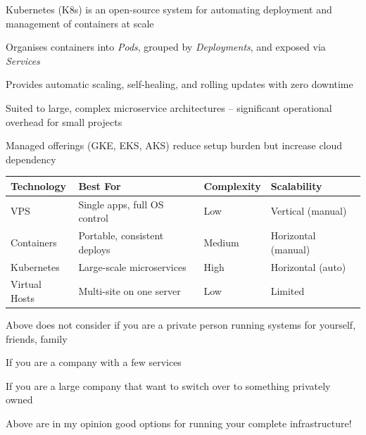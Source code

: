 \documentclass[Screen16to9,17pt]{foils}
\begin{document}


\begin{list2}
\item Kubernetes (K8s) is an open-source system for automating deployment and management of containers at scale
\item Organises containers into \textit{Pods}, grouped by \textit{Deployments}, and exposed via \textit{Services}
\item Provides automatic scaling, self-healing, and rolling updates with zero downtime
\item Suited to large, complex microservice architectures -- significant operational overhead for small projects
\item Managed offerings (GKE, EKS, AKS) reduce setup burden but increase cloud dependency
\end{list2}


\begin{center}
\begin{tabular}{|l|l|l|l|}
\hline
{\bf Technology} & {\bf Best For} & {\bf Complexity} & {\bf Scalability} \\
\hline
VPS              & Single apps, full OS control   & Low    & Vertical (manual)   \\
Containers       & Portable, consistent deploys   & Medium & Horizontal (manual) \\
Kubernetes       & Large-scale microservices      & High   & Horizontal (auto)   \\
Virtual Hosts    & Multi-site on one server       & Low    & Limited             \\
\hline
\end{tabular}
\end{center}

\begin{list2}
\item Above does not consider if you are a private person running systems for yourself, friends, family
\item If you are a company with a few services
\item If you are a large company that want to switch over to something privately owned
\item Above are in my opinion good options for running your complete infrastructure!
\end{list2}
\end{document}
